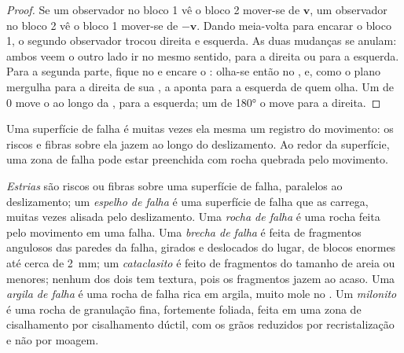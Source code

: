 \begin{proof}
Se um observador no bloco 1 vê o bloco 2 mover-se de $\mathbf v$, um observador no bloco 2 vê o bloco 1 mover-se de $-\mathbf v$. Dando meia-volta para encarar o bloco 1, o segundo observador trocou direita e esquerda. As duas mudanças se anulam: ambos veem o outro lado ir no mesmo sentido, para a direita ou para a esquerda. Para a segunda parte, fique no  e encare o : olha-se então no , e, como o plano mergulha para a direita de sua , a  aponta para a esquerda de quem olha. Um  de $0$ move o  ao longo da , para a esquerda; um  de \ang{180} o move para a direita.
\end{proof}

Uma superfície de falha é muitas vezes ela mesma um registro do movimento: os riscos e fibras sobre ela jazem ao longo do deslizamento. Ao redor da superfície, uma zona de falha pode estar preenchida com rocha quebrada pelo movimento.

\begin{definition}\label{def:b1:faults-folds-fabrics:fault-rocks}
\emph{Estrias} são riscos ou fibras sobre uma superfície de falha, paralelos ao deslizamento; um \emph{espelho de falha} é uma superfície de falha que as carrega, muitas vezes alisada pelo deslizamento. Uma \emph{rocha de falha} é uma rocha feita pelo movimento em uma falha. Uma \emph{brecha de falha} é feita de fragmentos angulosos das paredes da falha, girados e deslocados do lugar, de blocos enormes até cerca de \qty{2}{mm}; um \emph{cataclasito} é feito de fragmentos do tamanho de areia ou menores; nenhum dos dois tem textura, pois os fragmentos jazem ao acaso. Uma \emph{argila de falha} é uma rocha de falha rica em argila, muito mole no . Um \emph{milonito} é uma rocha de granulação fina, fortemente foliada, feita em uma zona de cisalhamento por cisalhamento dúctil, com os grãos reduzidos por recristalização e não por moagem.
\end{definition}

